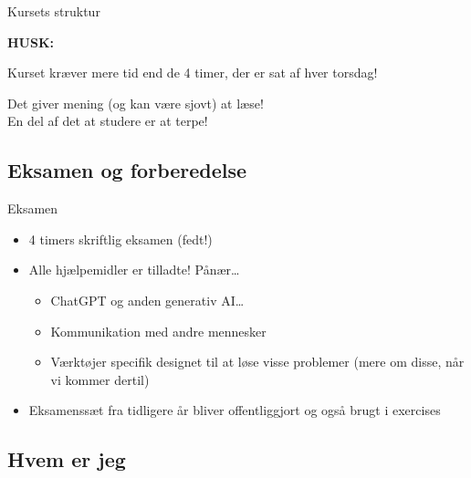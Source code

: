 \documentclass[aspectratio=1610]{beamer}
\begin{document}
\begin{frame}{Kursets struktur}

    \textbf{HUSK:}

    \medskip
    Kurset \alert{kræver mere tid end de 4 timer}, der er sat af hver
    torsdag!

    \medskip
    Det giver \alert{mening} (og kan være \alert{sjovt}) at \alert{læse}! \\

    \medskip
    En del af det at studere er at \alert{terpe}!
    
\end{frame}

\subsection[Eksamen]{Eksamen og forberedelse}

\begin{frame}{Eksamen}

    \begin{itemize}
        \item 4 timers skriftlig eksamen (fedt!)
            \pause
        \item Alle hjælpemidler er tilladte! \pause \alert{Pånær\ldots}
            \begin{itemize}
                \item ChatGPT og anden generativ AI\ldots
                \item Kommunikation med andre mennesker
                \item Værktøjer specifik designet til at løse visse problemer
                    (mere om disse, når vi kommer dertil)
            \end{itemize}
            \pause
        \item Eksamenssæt fra tidligere år bliver offentliggjort og også brugt i
            exercises
    \end{itemize}
    
\end{frame}

\subsection[Mig]{Hvem er jeg}
\end{document}
